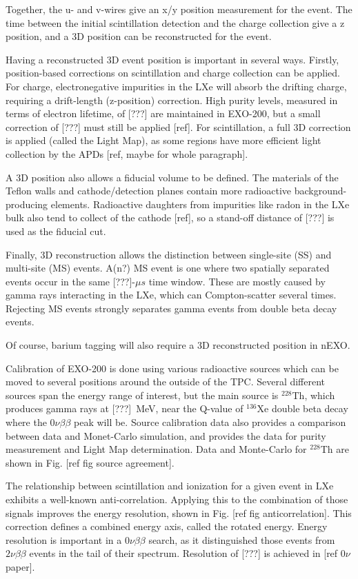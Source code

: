 Together, the u- and v-wires give an x/y position measurement for the event.  The time between the initial scintillation detection and the charge collection give a z position, and a 3D position can be reconstructed for the event.  

Having a reconstructed 3D event position is important in several ways.  Firstly, position-based corrections on scintillation and charge collection can be applied.  For charge, electronegative impurities in the LXe will absorb the drifting charge, requiring a drift-length (z-position) correction.  High purity levels, measured in terms of electron lifetime, of [???] are maintained in EXO-200, but a small correction of [???] must still be applied [ref].  For scintillation, a full 3D correction is applied (called the Light Map), as some regions have more efficient light collection by the APDs [ref, maybe for whole paragraph].

A 3D position also allows a fiducial volume to be defined.  The materials of the Teflon walls and cathode/detection planes contain more radioactive background-producing elements.  Radioactive daughters from impurities like radon in the LXe bulk also tend to collect of the cathode [ref], so a stand-off distance of [???] is used as the fiducial cut.

Finally, 3D reconstruction allows the distinction between single-site (SS) and multi-site (MS) events.  A(n?) MS event is one where two spatially separated events occur in the same [???]-$\mu s$ time window.  These are mostly caused by gamma rays interacting in the LXe, which can Compton-scatter several times.  Rejecting MS events strongly separates gamma events from double beta decay events.

Of course, barium tagging will also require a 3D reconstructed position in nEXO.

Calibration of EXO-200 is done using various radioactive sources which can be moved to several positions around the outside of the TPC.  Several different sources span the energy range of interest, but the main source is $^{228}$Th, which produces gamma rays at [???]~MeV, near the Q-value of $^{136}$Xe double beta decay where the $0\nu\beta\beta$ peak will be.  Source calibration data also provides a comparison between data and Monet-Carlo simulation, and provides the data for purity measurement and Light Map determination.  Data and Monte-Carlo for $^{228}$Th are shown in Fig. [ref fig source agreement].

The relationship between scintillation and ionization for a given event in LXe exhibits a well-known anti-correlation.  Applying this to the combination of those signals improves the energy resolution, shown in Fig. [ref fig anticorrelation].  This correction defines a combined energy axis, called the rotated energy.  Energy resolution is important in a $0\nu\beta\beta$ search, as it distinguished those events from $2\nu\beta\beta$ events in the tail of their spectrum.  Resolution of [???] is achieved in [ref $0\nu$ paper].

